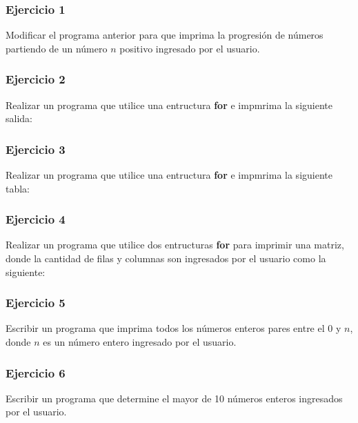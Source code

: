\subsubsection{Ejercicio 1} 
Modificar el programa anterior para que imprima la progresión de números partiendo de un número $n$ positivo ingresado por el usuario. 
{\small
  \lstset{inputencoding=utf8/latin1}
  
}

\subsubsection{Ejercicio 2} 
Realizar un programa que utilice una entructura \textbf{for} e impmrima la siguiente salida:
{\small
  \lstset{inputencoding=utf8/latin1}
  
}

\subsubsection{Ejercicio 3} 
Realizar un programa que utilice una entructura \textbf{for} e impmrima la siguiente tabla:
{\small
  \lstset{inputencoding=utf8/latin1}
  
}

\subsubsection{Ejercicio 4} 
Realizar un programa que utilice dos entructuras \textbf{for} para imprimir una matriz, donde la cantidad de filas y columnas son ingresados por el usuario como la siguiente:
{\small
  \lstset{inputencoding=utf8/latin1}
  
}

\subsubsection{Ejercicio 5} 
Escribir un programa que imprima todos los números enteros pares entre el 0 y $n$, donde $n$ es un número entero ingresado por el usuario.
{\small
  \lstset{inputencoding=utf8/latin1}
  
}

\subsubsection{Ejercicio 6} 
Escribir un programa que determine el mayor de 10 números enteros ingresados por el usuario.
{\small
  \lstset{inputencoding=utf8/latin1}
  
}

